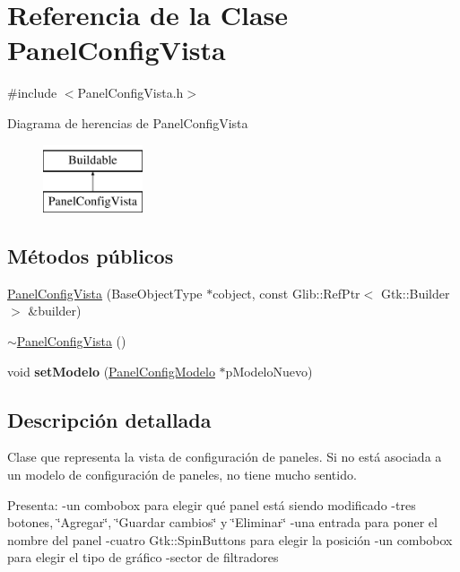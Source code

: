 \hypertarget{classPanelConfigVista}{\section{\-Referencia de la \-Clase \-Panel\-Config\-Vista}
\label{classPanelConfigVista}
}


{\ttfamily \#include $<$\-Panel\-Config\-Vista.\-h$>$}

\-Diagrama de herencias de \-Panel\-Config\-Vista\begin{figure}[H]
\begin{center}
\leavevmode
\includegraphics[height=2.000000cm]{classPanelConfigVista}
\end{center}
\end{figure}
\subsection*{\-Métodos públicos}
\begin{DoxyCompactItemize}
\item 
\hyperlink{classPanelConfigVista_a376507d0ca3558820c97763e235e286b}{\-Panel\-Config\-Vista} (\-Base\-Object\-Type $\ast$cobject, const \-Glib\-::\-Ref\-Ptr$<$ \-Gtk\-::\-Builder $>$ \&builder)
\item 
\hyperlink{classPanelConfigVista_adffb63a3355d20273752968ba4486ba3}{$\sim$\-Panel\-Config\-Vista} ()
\item 
\hypertarget{classPanelConfigVista_a3933046a55b8546bc6cde4d0645931db}{void {\bfseries set\-Modelo} (\hyperlink{classPanelConfigModelo}{\-Panel\-Config\-Modelo} $\ast$p\-Modelo\-Nuevo)}\label{classPanelConfigVista_a3933046a55b8546bc6cde4d0645931db}

\end{DoxyCompactItemize}


\subsection{\-Descripción detallada}
\-Clase que representa la vista de configuración de paneles. \-Si no está asociada a un modelo de configuración de paneles, no tiene mucho sentido.

\-Presenta\-: -\/un combobox para elegir qué panel está siendo modificado -\/tres botones, \char`\"{}\-Agregar\char`\"{}, \char`\"{}\-Guardar cambios\char`\"{} y \char`\"{}\-Eliminar\char`\"{} -\/una entrada para poner el nombre del panel -\/cuatro \-Gtk\-::\-Spin\-Buttons para elegir la posición -\/un combobox para elegir el tipo de gráfico -\/sector de filtradores 

